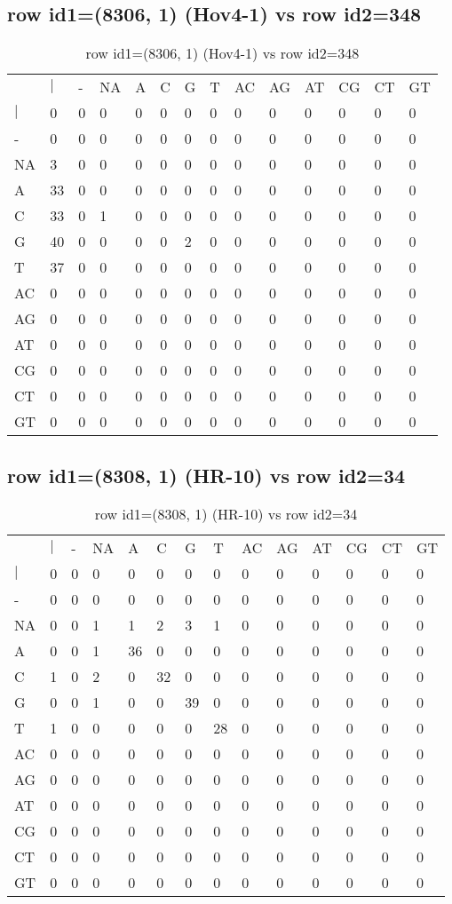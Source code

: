 \subsection{row id1=(8306, 1) (Hov4-1) vs row id2=348}
\begin{center}
\begin{longtable}{|l|l|l|l|l|l|l|l|l|l|l|l|l|l|}
\caption{row id1=(8306, 1) (Hov4-1) vs row id2=348} \label{table_dm288}\\
\hline
\\
\hline
&$|$&-&NA&A&C&G&T&AC&AG&AT&CG&CT&GT\\
$|$&0&0&0&0&0&0&0&0&0&0&0&0&0\\
-&0&0&0&0&0&0&0&0&0&0&0&0&0\\
NA&3&0&0&0&0&0&0&0&0&0&0&0&0\\
A&33&0&0&0&0&0&0&0&0&0&0&0&0\\
C&33&0&1&0&0&0&0&0&0&0&0&0&0\\
G&40&0&0&0&0&2&0&0&0&0&0&0&0\\
T&37&0&0&0&0&0&0&0&0&0&0&0&0\\
AC&0&0&0&0&0&0&0&0&0&0&0&0&0\\
AG&0&0&0&0&0&0&0&0&0&0&0&0&0\\
AT&0&0&0&0&0&0&0&0&0&0&0&0&0\\
CG&0&0&0&0&0&0&0&0&0&0&0&0&0\\
CT&0&0&0&0&0&0&0&0&0&0&0&0&0\\
GT&0&0&0&0&0&0&0&0&0&0&0&0&0\\
\hline
\end{longtable}
\end{center}

\subsection{row id1=(8308, 1) (HR-10) vs row id2=34}
\begin{center}
\begin{longtable}{|l|l|l|l|l|l|l|l|l|l|l|l|l|l|}
\caption{row id1=(8308, 1) (HR-10) vs row id2=34} \label{table_dm290}\\
\hline
\\
\hline
&$|$&-&NA&A&C&G&T&AC&AG&AT&CG&CT&GT\\
$|$&0&0&0&0&0&0&0&0&0&0&0&0&0\\
-&0&0&0&0&0&0&0&0&0&0&0&0&0\\
NA&0&0&1&1&2&3&1&0&0&0&0&0&0\\
A&0&0&1&36&0&0&0&0&0&0&0&0&0\\
C&1&0&2&0&32&0&0&0&0&0&0&0&0\\
G&0&0&1&0&0&39&0&0&0&0&0&0&0\\
T&1&0&0&0&0&0&28&0&0&0&0&0&0\\
AC&0&0&0&0&0&0&0&0&0&0&0&0&0\\
AG&0&0&0&0&0&0&0&0&0&0&0&0&0\\
AT&0&0&0&0&0&0&0&0&0&0&0&0&0\\
CG&0&0&0&0&0&0&0&0&0&0&0&0&0\\
CT&0&0&0&0&0&0&0&0&0&0&0&0&0\\
GT&0&0&0&0&0&0&0&0&0&0&0&0&0\\
\hline
\end{longtable}
\end{center}


